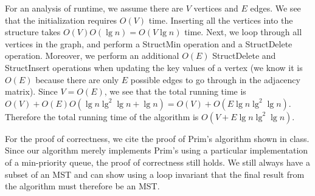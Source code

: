 \documentclass[psamsfonts]{amsart}
\newenvironment{sol}{{\bfseries Solution}}{\qedsymbol}
\theoremstyle{definition}
\theoremstyle{remark}
\numberwithin{equation}{section}
\begin{document}
\begin{sol}
For an analysis of runtime, we assume there are $V$ vertices and $E$ edges. We see that the initialization requires $O(V)$ time. Inserting all the vertices into the structure takes $O(V) O(\lg n) = O(V \lg n)$ time. Next, we loop through all vertices in the graph, and perform a StructMin operation and a StructDelete operation. Moreover, we perform an additional $O(E)$ StructDelete and StructInsert operations when updating the key values of a vertex (we know it is $O(E)$ because there are only $E$ possible edges to go through in the adjacency matrix). Since $V = O(E)$, we see that the total running time is $O(V) + O(E)O(\lg n \lg^2 \lg n + \lg n) = O(V) + O(E \lg n \lg^2 \lg n)$. Therefore the total running time of the algorithm is $O(V + E \lg n \lg^2 \lg n)$. 

For the proof of correctness, we cite the proof of Prim's algorithm shown in class. Since our algorithm merely implements Prim's using a particular implementation of a min-priority queue, the proof of correctness still holds. We still always have a subset of an MST and can show using a loop invariant that the final result from the algorithm must therefore be an MST. 
\end{sol}
\end{document}
